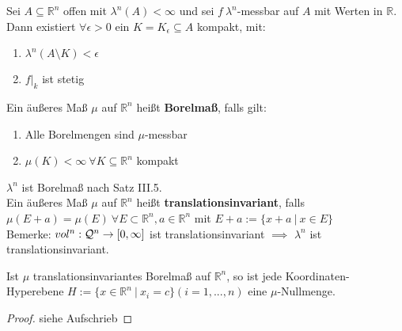 \documentclass[11pt,a4paper,fleqn,openany]{report}
\begin{document}
    \newpage

    \begin{theorem}
      Sei $A \subseteq \mathbb{R}^n$ offen mit $\lambda^n(A) < \infty$ und sei $f \ \lambda^n$-messbar auf $A$ mit Werten in $\mathbb{R}$. Dann existiert $\forall \epsilon > 0$ ein $K = K_{\epsilon} \subseteq A$ kompakt, mit:
      \begin{enumerate}[label=\roman*)]
        \item $\lambda^n(A \setminus K) < \epsilon$
        \item $f|_k$ ist stetig
      \end{enumerate}
    \end{theorem}


    \begin{definition}
      Ein äußeres Maß $\mu$ auf $\mathbb{R}^n$ heißt \textbf{Borelmaß}, falls gilt:
      \begin{enumerate}
        \item Alle Borelmengen sind $\mu$-messbar
        \item $\mu(K)<\infty \ \forall K \subseteq \mathbb{R}^n$ kompakt
      \end{enumerate}
    \end{definition}

    \begin{remark}
      $\lambda^n$ ist Borelmaß nach Satz III.5.\\
      Ein äußeres Maß $\mu$ auf $\mathbb{R}^n$ heißt \textbf{translationsinvariant}, falls \\
      $\mu(E + a) = \mu(E) \ \forall E \subset \mathbb{R}^n, a \in \mathbb{R}^n$ mit $E + a := \{x + a \ | \ x \in E\}$\\
      Bemerke: $vol^n:\mathcal{Q}^n \to [0, \infty]$ ist translationsinvariant $\implies$ $\lambda^n$ ist translationsinvariant.
    \end{remark}

    \begin{lemma}
      Ist $\mu$ translationsinvariantes Borelmaß auf $\mathbb{R}^n$, so ist jede Koordinaten-Hyperebene $H := \{x \in \mathbb{R}^n \ | \ x_i = c\} (i=1,...,n)$ eine $\mu$-Nullmenge.
    \end{lemma}

    \begin{proof}
      siehe Aufschrieb
    \end{proof}
\end{document}
